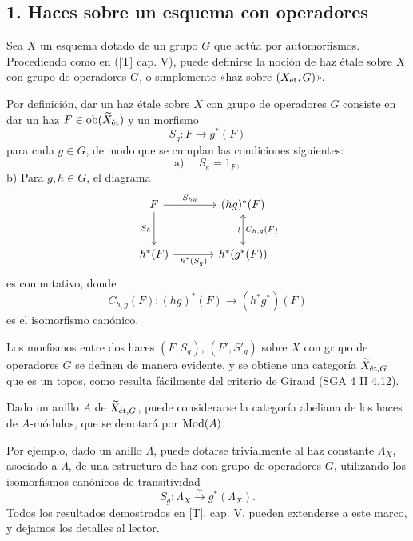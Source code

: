 \subsection*{1. Haces sobre un esquema con operadores}

Sea $X$ un esquema dotado de un grupo $G$ que actúa por automorfismos. Procediendo como en ([T] cap. V), puede definirse la noción de haz étale sobre $X$ con grupo de operadores $G$, o simplemente «haz sobre $(X_{\mathrm{\acute{e}t}},G)$».

Por definición, dar un haz étale sobre $X$ con grupo de operadores $G$ consiste en dar un haz $F\in \operatorname{ob}(\widetilde X_{\mathrm{\acute{e}t}})$ y un morfismo
\[
S_g:F\longrightarrow g^*(F)
\]
para cada $g\in G$, de modo que se cumplan las condiciones siguientes:
\[
\text{a) }\quad S_e=1_F,
\]
b) Para $g,h\in G$, el diagrama
\[
\begin{tikzcd}[column sep=large,row sep=large]
F \arrow[r,"S_{hg}"] \arrow[d,"S_h"'] & (hg)^*(F) \arrow[d,leftrightarrow,"\wr"',"C_{h,g}(F)"]\\
h^*(F) \arrow[r,"h^*(S_g)"'] & h^*(g^*(F))
\end{tikzcd}
\]
es conmutativo, donde
\[
C_{h,g}(F):(hg)^*(F)\longrightarrow (h^*g^*)(F)
\]
es el isomorfismo canónico.

Los morfismos entre dos haces $(F,S_g)$, $(F',S'_g)$ sobre $X$ con grupo de operadores $G$ se definen de manera evidente, y se obtiene una categoría $\widetilde X_{\mathrm{\acute{e}t},G}$ que es un topos, como resulta fácilmente del criterio de Giraud (SGA 4 II 4.12).

Dado un anillo $A$ de $\widetilde X_{\mathrm{\acute{e}t},G}$, puede considerarse la categoría abeliana de los haces de $A$-módulos, que se denotará por $\operatorname{Mod}(A)$.

Por ejemplo, dado un anillo $\Lambda$, puede dotarse trivialmente al haz constante $\Lambda_X$, asociado a $\Lambda$, de una estructura de haz con grupo de operadores $G$, utilizando los isomorfismos canónicos de transitividad
\[
S_g:\Lambda_X\xrightarrow{\sim}g^*(\Lambda_X).
\]
Todos los resultados demostrados en [T], cap. V, pueden extenderse a este marco, y dejamos los detalles al lector.
